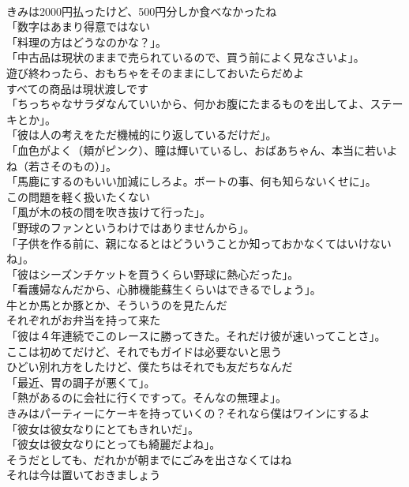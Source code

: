 \documentclass[8pt]{extreport}
\begin{document}
\begin{CJK}{UTF8}{min}
\\	きみは2000円払ったけど、500円分しか食べなかったね	
\\	「数字はあまり得意ではない 
\\	「料理の方はどうなのかな？」。	
\\	「中古品は現状のままで売られているので、買う前によく見なさいよ」。	
\\	遊び終わったら、おもちゃをそのままにしておいたらだめよ	
\\	すべての商品は現状渡しです	
\\	「ちっちゃなサラダなんていいから、何かお腹にたまるものを出してよ、ステーキとか」。	
\\	「彼は人の考えをただ機械的にり返しているだけだ」。	
\\	「血色がよく（頬がピンク）、瞳は輝いているし、おばあちゃん、本当に若いよね（若さそのもの）」。	
\\	「馬鹿にするのもいい加減にしろよ。ボートの事、何も知らないくせに」。	
\\	この問題を軽く扱いたくない	
\\	「風が木の枝の間を吹き抜けて行った」。	
\\	「野球のファンというわけではありませんから」。	
\\	「子供を作る前に、親になるとはどういうことか知っておかなくてはいけないね」。	
\\	「彼はシーズンチケットを買うくらい野球に熱心だった」。	
\\	「看護婦なんだから、心肺機能蘇生くらいはできるでしょう」。	
\\	牛とか馬とか豚とか、そういうのを見たんだ	
\\	それぞれがお弁当を持って来た	
\\	「彼は４年連続でこのレースに勝ってきた。それだけ彼が速いってことさ」。	
\\	ここは初めてだけど、それでもガイドは必要ないと思う	
\\	ひどい別れ方をしたけど、僕たちはそれでも友だちなんだ	
\\	「最近、胃の調子が悪くて」。	
\\	「熱があるのに会社に行くですって。そんなの無理よ」。	
\\	きみはパーティーにケーキを持っていくの？それなら僕はワインにするよ	
\\	「彼女は彼女なりにとてもきれいだ」。	
\\	「彼女は彼女なりにとっても綺麗だよね」。	
\\	そうだとしても、だれかが朝までにごみを出さなくてはね	
\\	それは今は置いておきましょう	

\end{CJK}
\end{document}
